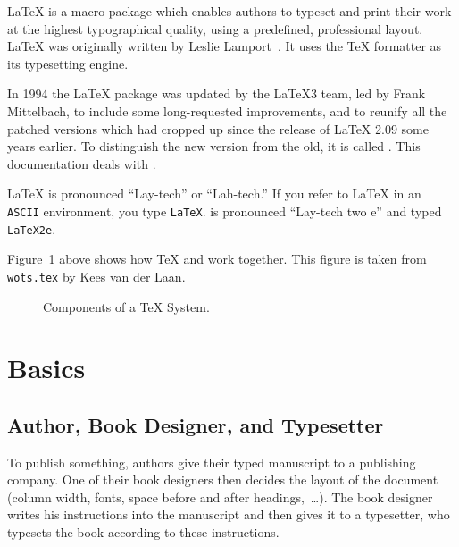 \LaTeX{} is a macro package which enables authors to typeset and print
their work at the highest typographical quality, using a predefined,
professional layout. \LaTeX{} was originally written by
Leslie Lamport~\cite{manual}. It uses the
\TeX{} formatter as its typesetting engine.

In 1994 the \LaTeX{} package was updated by the
\LaTeX 3 team, led by Frank Mittelbach, to include some long-requested improvements,
and to re\-unify all the patched versions which had cropped up since
the release of \LaTeX{} 2.09 some
years earlier. To distinguish the new version from the old, it is called
\LaTeXe. This documentation deals with
\LaTeXe.

\LaTeX{} is pronounced ``Lay-tech'' or ``Lah-tech.'' If you refer to
\LaTeX{} in an \texttt{ASCII} environment, you type \texttt{LaTeX}.
\LaTeXe{} is pronounced ``Lay-tech two e'' and typed \texttt{LaTeX2e}.

Figure~\ref{components} above %
shows how \TeX{} and \LaTeXe{} work together. This figure is taken from
\texttt{wots.tex} by Kees van der Laan.

\begin{figure}[btp]
\begin{lined}{0.8\textwidth}
\begin{center}

\end{center}
\end{lined}
\caption{Components of a \TeX{} System.} \label{components}
\end{figure}

\section{Basics}
 
\subsection{Author, Book Designer, and Typesetter}

To publish something, authors give their typed manuscript to a
publishing company. One of their book designers then
decides the layout of the document (column width, fonts, space before
and after headings,~\ldots). The book designer writes his instructions
into the manuscript and then gives it to a typesetter, who typesets the
book according to these instructions.

